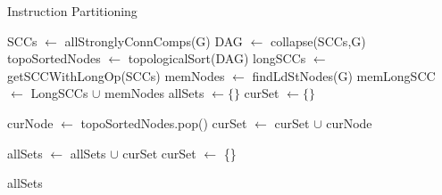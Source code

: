 \documentclass{sig-alternate}
\begin{document}
\setlength{\textfloatsep}{2pt}
\begin{algorithm}[t]
  \caption{Instruction Partitioning}\label{algo1}
  \begin{algorithmic}[1]
    \State SCCs $\gets$ allStronglyConnComps(G)
  \State DAG $\gets$ collapse(SCCs,G)
  \State topoSortedNodes $\gets$ topologicalSort(DAG)
  \State longSCCs $\gets$ getSCCWithLongOp(SCCs)
  \State memNodes $\gets$ findLdStNodes(G)
  \State memLongSCC $\gets$ LongSCCs $\cup$ memNodes
  \State allSets $\gets \{\}$
  \State curSet $\gets \{\}$

     \State curNode $\gets$ topoSortedNodes.pop()
     \State curSet $\gets$ curSet $\cup$ curNode
    
    \State allSets $\gets$ allSets $\cup$ curSet
    \State curSet $\gets$ \{\}
     \EndIf

     
  \EndWhile
  \State \Return allSets 
  
    \EndProcedure
  

\end{algorithmic}
\end{algorithm}
\end{document}
